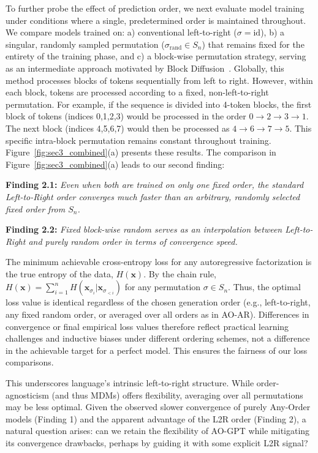 To further probe the effect of prediction order, we next evaluate model training under conditions where a single, predetermined order is maintained throughout. We compare models trained on: a) conventional left-to-right ($\sigma=\text{id}$), b) a singular, randomly sampled permutation ($\sigma_{\text{rand}} \in S_n$) that remains fixed for the entirety of the training phase, and c) a block-wise permutation strategy, serving as an intermediate approach motivated by Block Diffusion~\cite{arriola2025block}. Globally, this method processes blocks of tokens sequentially from left to right. However, within each block, tokens are processed according to a fixed, non-left-to-right permutation. For example, if the sequence is divided into 4-token blocks, the first block of tokens (indices 0,1,2,3) would be processed in the order $0 \to 2 \to 3 \to 1$. The next block (indices 4,5,6,7) would then be processed as $4 \to 6 \to 7 \to 5$. This specific intra-block permutation remains constant throughout training. Figure~\ref{fig:sec3_combined}(a) presents these results. The comparison in Figure~\ref{fig:sec3_combined}(a) leads to our second finding:
\begin{tcolorbox}[
    enhanced,
    colback=LightGoldenrodYellow!40,
    colframe=black!20,
    arc=2mm, 
    boxrule=0.5pt, 
    boxsep=0mm,
    before skip=2mm,
    after skip=2mm
]
\textbf{Finding 2.1:} \textit{Even when both are trained on only one fixed order, the standard Left-to-Right order converges much faster than an arbitrary, randomly selected fixed order from $S_n$.}

\textbf{Finding 2.2:} \textit{Fixed block-wise random serves as an interpolation between Left-to-Right and purely random order in terms of convergence speed.}
\end{tcolorbox}
\begin{remark}
The minimum achievable cross-entropy loss for any autoregressive factorization is the true entropy of the data, $H(\boldsymbol{x})$.
By the chain rule, $H(\boldsymbol{x}) = \sum_{i=1}^n H(\boldsymbol{x}_{\sigma_i} | \boldsymbol{x}_{\sigma_{<i}})$ for any permutation $\sigma \in S_n$.
Thus, the optimal loss value is identical regardless of the chosen generation order (e.g., left-to-right, any fixed random order, or averaged over all orders as in AO-AR).
Differences in convergence or final empirical loss values therefore reflect practical learning challenges and inductive biases under different ordering schemes, not a difference in the achievable target for a perfect model.
This ensures the fairness of our loss comparisons.
\end{remark}
This underscores language's intrinsic left-to-right structure. While order-agnosticism (and thus MDMs) offers flexibility, averaging over all permutations may be less optimal. 
Given the observed slower convergence of purely Any-Order models (Finding 1) and the apparent advantage of the L2R order (Finding 2), a natural question arises: can we retain the flexibility of AO-GPT while mitigating its convergence drawbacks, perhaps by guiding it with some explicit L2R signal?

